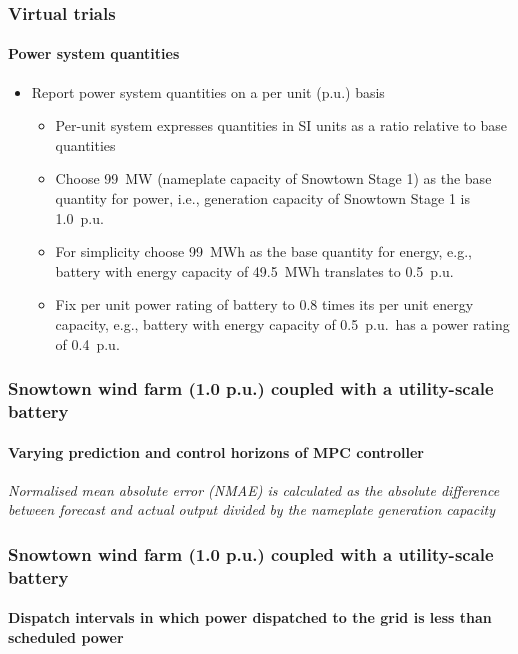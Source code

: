 \documentclass[presentation, smaller, table, svgnames]{beamer}
\begin{document}
\begin{frame}
	\frametitle{Virtual trials}
	\framesubtitle{Power system quantities}

	\begin{itemize}
		\item  Report power system quantities on a per unit (p.u.) basis
		\begin{itemize}
			\item  Per-unit system expresses quantities in SI units as a ratio relative to base quantities
			\item  Choose 99~MW (nameplate capacity of Snowtown Stage 1) as the base quantity for power, i.e., generation capacity of Snowtown Stage 1 is 1.0~p.u. 
			\item  For simplicity choose 99~MWh as the base quantity for energy, e.g., battery with energy capacity of 49.5~MWh translates to 0.5~p.u.
			\item  Fix per unit power rating of battery to 0.8 times its per unit energy capacity, e.g., battery with energy capacity of 0.5~p.u.\ has a power rating of 0.4~p.u.
		\end{itemize}
				
	\end{itemize}
	
\end{frame}

\begin{frame}
	\frametitle{\large Snowtown wind farm (1.0 p.u.) coupled with a utility-scale battery}
	\framesubtitle{Varying prediction and control horizons of MPC controller}

	\begin{figure}[!h]
		\centering
    		\label{fig:disp_wind_bess}
		\scalebox{0.67}{
			
		}
	\end{figure}
	
	{\scriptsize \textit{Normalised mean absolute error (NMAE) is calculated as the absolute difference between forecast and actual output divided by the nameplate generation capacity}
	\par
	}

\end{frame}

\begin{frame}
	\frametitle{\large Snowtown wind farm (1.0 p.u.) coupled with a utility-scale battery}
	\framesubtitle{Dispatch intervals in which power dispatched to the grid is less than scheduled power}

	\begin{figure}[!h]
		\centering
    		\label{fig:disp_wind_bess}
		\scalebox{0.75}{
			
		}
	\end{figure}

\end{frame}
\end{document}
